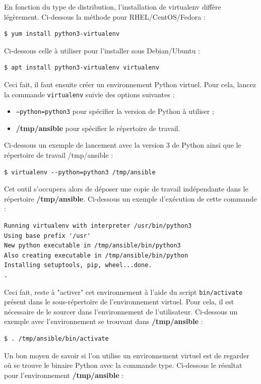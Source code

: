 \documentclass[hidelinks]{article}
\begin{document}
En fonction du type de distribution, l'installation de virtualenv diffère légèrement. Ci-dessous la méthode pour RHEL/CentOS/Fedora :
\begin{verbatim}
$ yum install python3-virtualenv
\end{verbatim}

Ci-dessous celle à utiliser pour l'installer sous Debian/Ubuntu :
\begin{verbatim}
$ apt install python3-virtualenv virtualenv
\end{verbatim}

Ceci fait, il faut ensuite créer un environnement Python virtuel. Pour cela, lancez la commande \texttt{virtualenv} suivie des options suivantes :
\begin{itemize}
    \item \texttt{--python=python3} pour spécifier la version de Python à utiliser ;
    \item \textbf{/tmp/ansible} pour spécifier le répertoire de travail.
\end{itemize}
Ci-dessous un exemple de lancement avec la version 3 de Python ainsi que le répertoire de travail /tmp/ansible :
\begin{verbatim}
$ virtualenv --python=python3 /tmp/ansible
\end{verbatim}

Cet outil s'occupera alors de déposer une copie de travail indépendante dans le répertoire \textbf{/tmp/ansible}. Ci-dessous un exemple d'exécution de cette commande :

\begin{verbatim}
Running virtualenv with interpreter /usr/bin/python3
Using base prefix '/usr' 
New python executable in /tmp/ansible/bin/python3 
Also creating executable in /tmp/ansible/bin/python 
Installing setuptools, pip, wheel...done. 
.
\end{verbatim}


Ceci fait, reste à "activer" cet environnement à l'aide du script \texttt{bin/activate} présent dans le sous-répertoire de l'environnement virtuel. Pour cela, il est nécessaire de le sourcer dans l'environnement de l'utilisateur. Ci-dessous un exemple avec l'environnement se trouvant dans \textbf{/tmp/ansible} :
\begin{verbatim}
$ . /tmp/ansible/bin/activate
\end{verbatim}

Un bon moyen de savoir si l'on utilise un environnement virtuel est de regarder où se trouve le binaire Python avec la commande type. Ci-dessous le résultat pour l'environnement \textbf{/tmp/ansible} :
\end{document}
